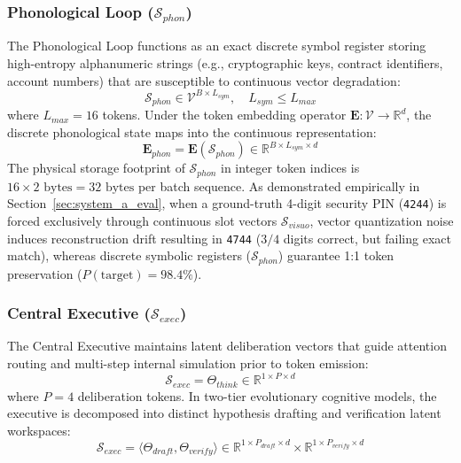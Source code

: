 \documentclass[11pt,a4paper]{article}
\begin{document}
\subsubsection{Phonological Loop ($\mathcal{S}_{phon}$)}
The Phonological Loop functions as an exact discrete symbol register storing high-entropy alphanumeric strings (e.g., cryptographic keys, contract identifiers, account numbers) that are susceptible to continuous vector degradation:
\begin{equation}
\mathcal{S}_{phon} \in \mathcal{V}^{B \times L_{sym}}, \quad L_{sym} \le L_{max}
\end{equation}
where $L_{max} = 16$ tokens. Under the token embedding operator $\mathbf{E}: \mathcal{V} \to \mathbb{R}^d$, the discrete phonological state maps into the continuous representation:
\begin{equation}
\mathbf{E}_{phon} = \mathbf{E}(\mathcal{S}_{phon}) \in \mathbb{R}^{B \times L_{sym} \times d}
\end{equation}
The physical storage footprint of $\mathcal{S}_{phon}$ in integer token indices is $16 \times 2\text{ bytes} = 32\text{ bytes}$ per batch sequence. As demonstrated empirically in Section~\ref{sec:system_a_eval}, when a ground-truth 4-digit security PIN (\texttt{4244}) is forced exclusively through continuous slot vectors $\mathcal{S}_{visuo}$, vector quantization noise induces reconstruction drift resulting in \texttt{4744} ($3/4$ digits correct, but failing exact match), whereas discrete symbolic registers ($\mathcal{S}_{phon}$) guarantee 1:1 token preservation ($P(\text{target}) = 98.4\%$).

\subsubsection{Central Executive ($\mathcal{S}_{exec}$)}
The Central Executive maintains latent deliberation vectors that guide attention routing and multi-step internal simulation prior to token emission:
\begin{equation}
\mathcal{S}_{exec} = \Theta_{think} \in \mathbb{R}^{1 \times P \times d}
\end{equation}
where $P = 4$ deliberation tokens. In two-tier evolutionary cognitive models, the executive is decomposed into distinct hypothesis drafting and verification latent workspaces:
\begin{equation}
\mathcal{S}_{exec} = \langle \Theta_{draft}, \Theta_{verify} \rangle \in \mathbb{R}^{1 \times P_{draft} \times d} \times \mathbb{R}^{1 \times P_{verify} \times d}
\end{equation}
\end{document}
